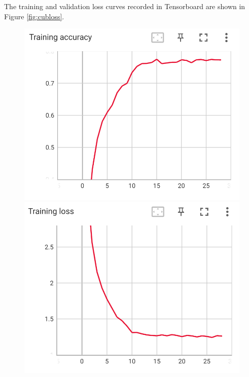 \documentclass[UTF8]{ctexart}
\begin{document}
The training and validation loss curves recorded in Tensorboard are shown in Figure \ref{fig:cubloss}.
\begin{figure}[h]
    \centering
    \begin{minipage}{0.45\textwidth}
        \centering
        \includegraphics[width=\textwidth]{figs/TensorBoard/CUB_ft/ft_train_acc.png}
    \end{minipage}
    \hfill
    \begin{minipage}{0.45\textwidth}
        \centering
        \includegraphics[width=\textwidth]{figs/TensorBoard/CUB_ft/ft_train_loss.png}
    \end{minipage}


\end{figure}
\end{document}
